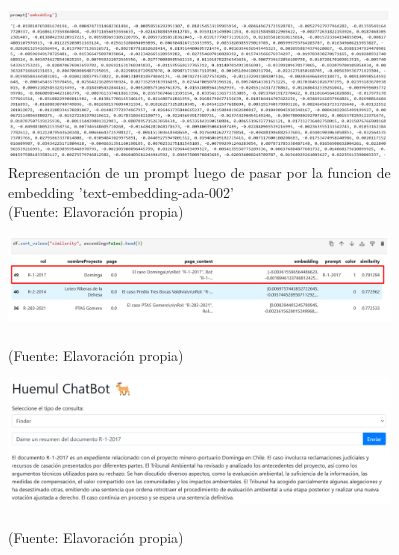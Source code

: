 \begin{figure}[ht!]
    \centering
    \includegraphics[width=0.9\textwidth]{figures/embedding1.png}
    \caption[Representación de un prompt luego de pasar por la funcion de embedding 'text-embedding-ada-002']{Representación de un prompt luego de pasar por la funcion de embedding 'text-embedding-ada-002'\\
    {\scriptsize (Fuente: Elavoración propia)}}
    \label{fig:chatbot1}
\end{figure}



\begin{figure}[ht!]
    \centering
    \includegraphics[width=0.9\textwidth]{figures/embedding2.png}
    \caption[]{\\
    {\scriptsize (Fuente: Elavoración propia)}}
    \label{fig:chatbot1}
\end{figure}



\begin{figure}[ht!]
    \centering
    \includegraphics[width=0.9\textwidth]{figures/website2.png}
    \caption[]{\\
    {\scriptsize (Fuente: Elavoración propia)}}
    \label{fig:chatbot1}
\end{figure}